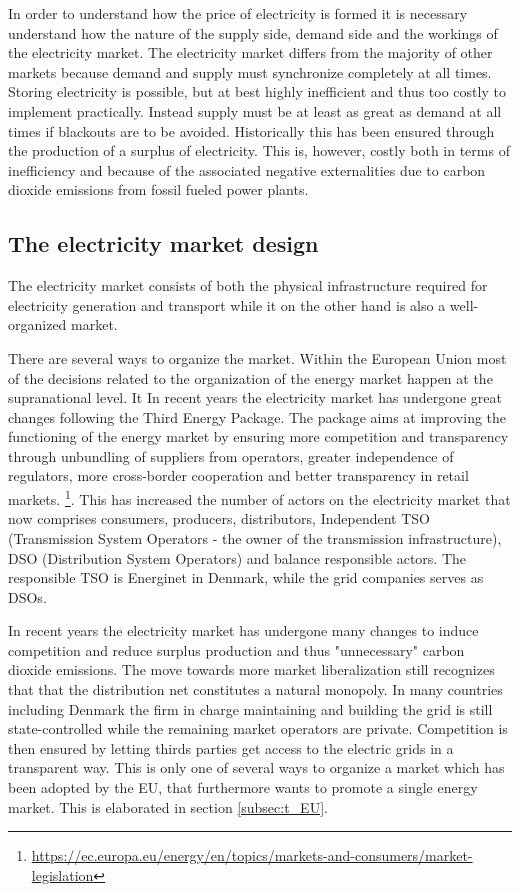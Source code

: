 \label{sec:theory}
In order to understand how the price of electricity is formed it is necessary understand how the nature of the supply side, demand side and the workings of the electricity market. The electricity market differs from the majority of other markets because demand and supply must synchronize completely at all times. Storing electricity is possible, but at best highly inefficient and thus too costly to implement practically. Instead supply must be at least as great as demand at all times if blackouts are to be avoided. Historically this has been ensured through the production of a surplus of electricity. This is, however, costly both in terms of inefficiency and because of the associated negative externalities due to carbon dioxide emissions from fossil fueled power plants.


\subsection{The electricity market design}
\label{subsec:t_market}
The electricity market consists of both the physical infrastructure required for electricity generation and transport while it on the other hand is also a well-organized market.
\medskip

There are several ways to organize the market. Within the European Union most of the decisions related to the organization of the energy market happen at the supranational level. It In recent years the electricity market has undergone great changes following the Third Energy Package. The package aims at improving the functioning of the energy market by ensuring more competition and transparency through unbundling of suppliers from operators, greater independence of regulators, more cross-border cooperation and better transparency in retail markets. \footnote{\url{https://ec.europa.eu/energy/en/topics/markets-and-consumers/market-legislation}}. This has increased the number of actors on the electricity market that now comprises consumers, producers, distributors, Independent TSO (Transmission System Operators - the owner of the transmission infrastructure), DSO (Distribution System Operators) and balance responsible actors. The responsible TSO is Energinet in Denmark, while the grid companies serves as DSOs. 
\medskip

In recent years the electricity market has undergone many changes to induce competition and reduce surplus production and thus "unnecessary" carbon dioxide emissions. The move towards more market liberalization still recognizes that that the distribution net constitutes a natural monopoly. In many countries including Denmark the firm in charge maintaining and building the grid is still state-controlled while the remaining market operators are private. Competition is then ensured by letting thirds parties get access to the electric grids in a transparent way. This is only one of several ways to organize a market which has been adopted by the EU, that furthermore wants to promote a single energy market. This is elaborated in section \ref{subsec:t_EU}.
\par 

